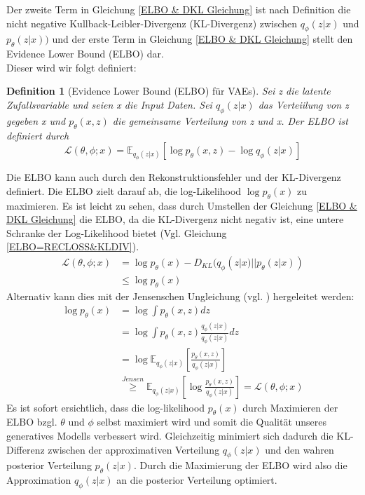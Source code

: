\documentclass[%
thesis=student,%
coverpage=false,%
titlepage=false,%
headmarks=true, %
german,%
font=libertine, %
math=newpxtx, %
BCOR=5mm,%
coverBCOR=11mm%
]{tumbook}
\theoremstyle{break}
\newtheorem{definition}{Definition}[section]
\begin{document}
Der zweite Term in Gleichung \ref{ELBO & DKL Gleichung} ist nach Definition die nicht negative Kullback-Leibler-Divergenz (KL-Divergenz) zwischen $q_\phi(z|x)$ und $p_\theta(z|x))$ und der erste Term in Gleichung \ref{ELBO & DKL Gleichung} stellt den Evidence Lower Bound (ELBO) dar.\\
Dieser wird wir folgt definiert:\\
\begin{definition}[Evidence Lower Bound (ELBO) für VAEs]
	Sei z die latente Zufallsvariable und seien x die Input Daten.
	Sei $q_\phi(z|x)$ das Verteiilung von z gegeben x und $p_\theta(x,z)$ die gemeinsame Verteilung von z und x. Der ELBO ist definiert durch
	$$ \mathcal{L}(\theta,\phi;x) = \mathbb{E}_{q_\phi(z|x)}[\log p_\theta(x,z) - \log q_\phi(z|x)] $$ 
\end{definition}\noindent
Die ELBO kann auch durch den Rekonstruktionsfehler und der KL-Divergenz definiert.
Die ELBO zielt darauf ab, die log-Likelihood $\log p_\theta(x)$ zu maximieren. 
Es ist leicht zu sehen, dass durch Umstellen der Gleichung \ref{ELBO & DKL Gleichung} die ELBO, da die KL-Divergenz nicht negativ ist, eine untere Schranke der Log-Likelihood bietet (Vgl. Gleichung \ref{ELBO=RECLOSS&KLDIV}).
\begin{align}
	\mathcal{L}(\theta,\phi;x) &= \log p_\theta(x) - D_{KL}(q_\phi(z|x)||p_\theta(z|x)) \label{ELBO=RECLOSS&KLDIV}\\
	&\leq 	\log p_\theta(x) 
\end{align}\noindent
Alternativ kann dies mit der Jensenschen Ungleichung (vgl. \cite{JensenscheUngleichung}) hergeleitet werden:
\begin{align}
	\log p_\theta(x) &= \log \int p_\theta(x,z) dz \\
	&= \log \int p_\theta(x,z) \frac{q_\phi(z|x)}{q_\phi(z|x)} dz \\
	& = \log \mathbb{E}_{q_\phi(z|x)}\left[\frac{p_\theta(x,z)}{q_\phi(z|x)}\right] \\
	& \overset{Jensen}{\geq} \mathbb{E}_{q_\phi(z|x)}\left[\log \frac{p_\theta(x,z)}{q_\phi(z|x)}\right] = \mathcal{L}(\theta,\phi;x)
\end{align}\noindent
Es ist sofort ersichtlich, dass die log-likelihood $p_\theta(x)$ durch Maximieren der ELBO bzgl. $\theta$ und  $\phi$ selbst maximiert wird und somit die Qualität unseres generatives Modells verbessert wird. Gleichzeitig minimiert sich dadurch die KL-Differenz zwischen der approximativen Verteilung $q_\phi(z|x)$ und den wahren posterior Verteilung $p_\theta(z|x)$. Durch die Maximierung der ELBO wird also die Approximation $q_\phi(z|x)$ an die posterior Verteilung optimiert. \\
\end{document}
